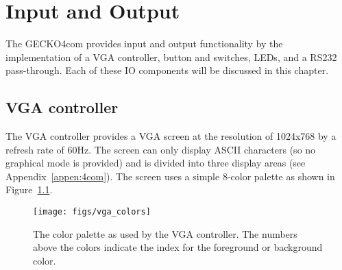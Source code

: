 \chapter{Input and Output}
\label{chap:IO}
The {\sc GECKO4com} provides input and output functionality by the
implementation of a VGA controller, button and switches, LEDs, and a RS232
pass-through. Each of these IO components will be discussed in this chapter.
\section{VGA controller}
\label{sec: vga}
The VGA controller provides a VGA screen at the resolution of 1024x768 by a
refresh rate of 60Hz. The screen can only display ASCII characters (so no
graphical mode is provided) and is divided into three display areas (see
Appendix~\ref{appen:4com}). The screen uses a simple 8-color palette as shown in
Figure~\ref{fig:vga color}. 
\begin{figure}[hb]
\centering%
\texttt{[image: figs/vga\_colors]}
\caption{The color palette as used by the VGA controller. The numbers above the
colors indicate the index for the foreground or background color.}
\label{fig:vga color}
\end{figure}

